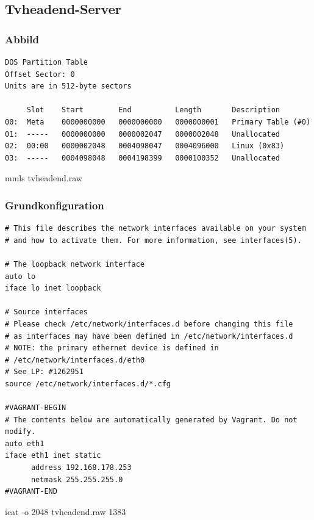 \subsection{Tvheadend-Server}

\subsubsection{Abbild}

\begin{cmd}[H]
\begin{verbatim}
DOS Partition Table
Offset Sector: 0
Units are in 512-byte sectors

     Slot    Start        End          Length       Description
00:  Meta    0000000000   0000000000   0000000001   Primary Table (#0)
01:  -----   0000000000   0000002047   0000002048   Unallocated
02:  00:00   0000002048   0004098047   0004096000   Linux (0x83)
03:  -----   0004098048   0004198399   0000100352   Unallocated
\end{verbatim}
\caption{mmls tvheadend.raw}
\label{cmd:tvheadend-mmls}
\end{cmd}

\subsubsection{Grundkonfiguration}

\begin{cmd}[H]
\begin{verbatim}
# This file describes the network interfaces available on your system
# and how to activate them. For more information, see interfaces(5).

# The loopback network interface
auto lo
iface lo inet loopback

# Source interfaces
# Please check /etc/network/interfaces.d before changing this file
# as interfaces may have been defined in /etc/network/interfaces.d
# NOTE: the primary ethernet device is defined in
# /etc/network/interfaces.d/eth0
# See LP: #1262951
source /etc/network/interfaces.d/*.cfg

#VAGRANT-BEGIN
# The contents below are automatically generated by Vagrant. Do not modify.
auto eth1
iface eth1 inet static
      address 192.168.178.253
      netmask 255.255.255.0
#VAGRANT-END
\end{verbatim}
\caption{icat -o 2048 tvheadend.raw 1383}
\label{cmd:tvheadend-interfaces}
\end{cmd}

